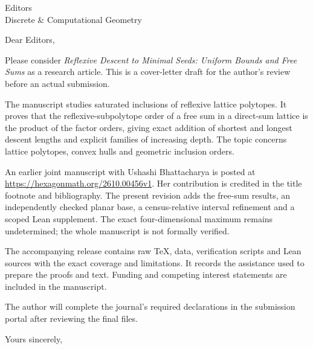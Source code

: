 \documentclass[11pt]{letter}
\date{October 26, 2026}
\begin{document}
\begin{letter}{Editors\\Discrete \& Computational Geometry}
\opening{Dear Editors,}
Please consider \emph{Reflexive Descent to Minimal Seeds: Uniform Bounds and
Free Sums} as a research article. This is a cover-letter draft for the
author's review before an actual submission.

The manuscript studies saturated inclusions of reflexive lattice polytopes.
It proves that the reflexive-subpolytope order of a free sum in a direct-sum
lattice is the product of the factor orders, giving exact addition of
shortest and longest descent lengths and explicit families of increasing
depth. The topic concerns lattice polytopes, convex hulls and geometric
inclusion orders.

An earlier joint manuscript with Ushashi Bhattacharya is posted at
\url{https://hexagonmath.org/2610.00456v1}. Her contribution is credited in
the title footnote and bibliography. The present revision adds the free-sum
results, an independently checked planar base, a census-relative interval
refinement and a scoped Lean supplement. The exact four-dimensional maximum
remains undetermined; the whole manuscript is not formally verified.

The accompanying release contains raw TeX, data, verification scripts and
Lean sources with the exact coverage and limitations. It records the
assistance used to prepare the proofs and text. Funding and competing
interest statements are included in the manuscript.

The author will complete the journal's required declarations in the
submission portal after reviewing the final files.
\closing{Yours sincerely,}
\end{letter}
\end{document}
